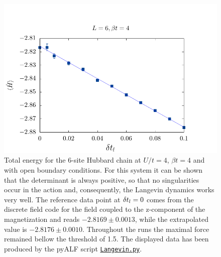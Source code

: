 \begin{figure}[H]
        \begin{center}
                \includegraphics[scale=0.9,clip]{Figures/Langevin.pdf}
            \end{center}
        \caption{Total energy for the 6-site Hubbard chain at $U/t=4$, $\beta t = 4$ and with open boundary conditions. For this system it can be shown that the determinant is always positive, so that no singularities occur in the action and, consequently, the Langevin dynamics works very well.  The reference data point at $\delta t_{l} =0$ comes from the discrete field code for the field coupled to the z-component of the magnetization and reads $-2.8169 \pm 0.0013$, while the extrapolated value is $-2.8176 \pm 0.0010$. Throughout the runs the maximal force remained bellow the threshold of 1.5. The displayed data has been produced by the pyALF script 
         \href{https://git.physik.uni-wuerzburg.de/ALF/pyALF/-/blob/master/Scripts/Langevin.py}{\texttt{Langevin.py}}. }\label{Langevin.fig}
\end{figure}

